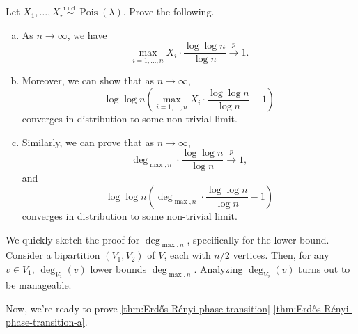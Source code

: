 \begin{exercise}
	Let \(X_1, \dots , X_r \overset{\text{i.i.d.} }{\sim } \operatorname{Pois}(\lambda ) \). Prove the following.
	\begin{enumerate}[(a)]
		\item As \(n \to \infty \), we have
		      \[
			      \max _{i = 1, \dots , n} X_i \cdot \frac{\log \log n}{\log n}
			      \overset{p}{\to} 1.
		      \]
		\item Moreover, we can show that as \(n \to \infty \),
		      \[
			      \log \log n \left( \max _{i = 1, \dots , n} X_i \cdot \frac{\log \log n}{\log n} - 1 \right)
		      \]
		      converges in distribution to some non-trivial limit.
		\item Similarly, we can prove that as \(n \to \infty \),
		      \[
			      \deg _{\max , n} \cdot \frac{\log \log n}{\log n}
			      \overset{p}{\to} 1,
		      \]
		      and
		      \[
			      \log \log n \left( \deg _{\max , n} \cdot \frac{\log \log n}{\log n} - 1\right)
		      \]
		      converges in distribution to some non-trivial limit.
	\end{enumerate}
\end{exercise}
\begin{answer}
	We quickly sketch the proof for \(\deg _{\max , n}\), specifically for the lower bound. Consider a bipartition \((V_1, V_2)\) of \(V\), each with \(n / 2\) vertices. Then, for any \(v \in V_1\), \(\deg _{V_2}(v)\) lower bounds \(\deg _{\max , n}\). Analyzing \(\deg _{V_2}(v)\) turns out to be manageable.
\end{answer}

Now, we're ready to prove \autoref{thm:Erdős-Rényi-phase-transition} \autoref{thm:Erdős-Rényi-phase-transition-a}.

